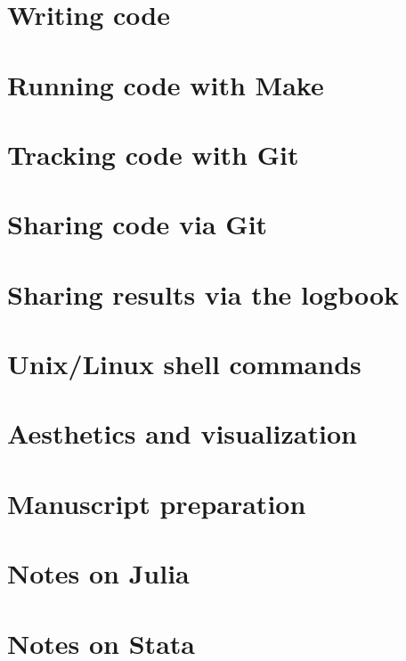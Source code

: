 \documentclass{report}
\numberwithin{equation}{section}
\numberwithin{figure}{section}
\numberwithin{table}{section}
\begin{document}
\section{Writing code} 
\section{Running code with Make} 
\section{Tracking code with Git} 

\section{Sharing code via Git} 
\section{Sharing results via the logbook} 

\section{Unix/Linux shell commands} 
\section{Aesthetics and visualization} 
\section{Manuscript preparation} 
\section{Notes on Julia} 

\section{Notes on Stata} 
\end{document}
